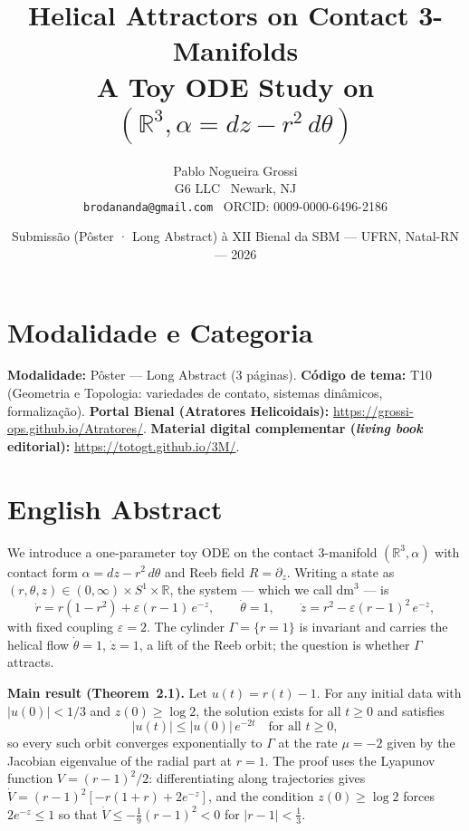 \documentclass[11pt,a4paper]{article}
\title{\textbf{Helical Attractors on Contact 3-Manifolds}\\[0.3em]
\large A Toy ODE Study on $(\mathbb{R}^3,\alpha = dz - r^2\,d\theta)$}
\author{Pablo Nogueira Grossi\\
\small G6 LLC \textbullet\ Newark, NJ\\
\small \texttt{brodananda@gmail.com} \textbullet\ ORCID: 0009-0000-6496-2186}
\date{Submissão (Pôster · Long Abstract) à XII Bienal da SBM --- UFRN, Natal-RN --- 2026}
\begin{document}
\maketitle

\section*{Modalidade e Categoria}
\noindent
\textbf{Modalidade:} Pôster --- Long Abstract (3 páginas).\quad
\textbf{Código de tema:} T10 (Geometria e Topologia: variedades de contato, sistemas dinâmicos, formalização).\quad
\textbf{Portal Bienal (Atratores Helicoidais):} \url{https://grossi-ops.github.io/Atratores/}.\quad
\textbf{Material digital complementar (\emph{living book} editorial):} \url{https://totogt.github.io/3M/}.

\section*{English Abstract}

We introduce a one-parameter toy ODE on the contact 3-manifold $(\mathbb{R}^3,\alpha)$ with contact form $\alpha = dz - r^2\,d\theta$ and Reeb field $R = \partial_z$. Writing a state as $(r,\theta,z)\in(0,\infty)\times S^1\times\mathbb{R}$, the system --- which we call $\mathrm{dm}^3$ --- is
\begin{equation}\label{eq:dm3}
\dot r = r(1 - r^2) + \varepsilon(r-1)\,e^{-z},\qquad
\dot \theta = 1,\qquad
\dot z = r^2 - \varepsilon(r-1)^2\,e^{-z},
\end{equation}
with fixed coupling $\varepsilon = 2$. The cylinder $\Gamma = \{r=1\}$ is invariant and carries the helical flow $\dot\theta = 1$, $\dot z = 1$, a lift of the Reeb orbit; the question is whether $\Gamma$ attracts.

\textbf{Main result (Theorem~2.1).} Let $u(t) = r(t) - 1$. For any initial data with $|u(0)| < 1/3$ and $z(0) \geq \log 2$, the solution exists for all $t \geq 0$ and satisfies
\[
|u(t)| \leq |u(0)|\,e^{-2t}
\quad\text{for all } t \geq 0,
\]
so every such orbit converges exponentially to $\Gamma$ at the rate $\mu = -2$ given by the Jacobian eigenvalue of the radial part at $r=1$. The proof uses the Lyapunov function $V = (r-1)^2/2$: differentiating along trajectories gives $\dot V = (r-1)^2[-r(1+r)+2e^{-z}]$, and the condition $z(0)\geq\log 2$ forces $2e^{-z}\leq 1$ so that $\dot V \leq -\tfrac{1}{9}(r-1)^2 < 0$ for $|r-1|<\tfrac{1}{3}$.
\end{document}
